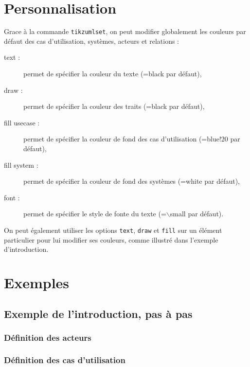 \documentclass[a4paper,11pt]{report}
\newcommand{\inputTikZ}[1]{%
  }%
\newcommand{\inputTikZ}[1]{%
    \texttt{[image: fig/\#1.pdf]}%
  }%
\begin{document}
\section{Personnalisation}\label{s.fitusecase}

Grace à la commande {\tt tikzumlset}, on peut modifier globalement les couleurs par défaut des cas d'utilisation, systèmes, acteurs et relations :

\begin{description}
\item[text :] permet de spécifier la couleur du texte (=black par défaut),
\item[draw :] permet de spécifier la couleur des traits (=black par défaut),
\item[fill usecase :] permet de spécifier la couleur de fond des cas d'utilisation (=blue!20 par défaut),
\item[fill system :] permet de spécifier la couleur de fond des systèmes (=white par défaut),
\item[font :] permet de spécifier le style de fonte du texte (=$\backslash$small par défaut).
\end{description}

On peut également utiliser les options {\tt text}, {\tt draw} et {\tt fill} sur un élément particulier pour lui modifier ses couleurs, comme illustré dans l'exemple d'introduction.

\section{Exemples}

\subsection{Exemple de l'introduction, pas à pas}

\subsubsection{Définition des acteurs}

{\color{red!70!black}

}

\begin{center}
\inputTikZ{usecasediagstep1}
\end{center}

\subsubsection{Définition des cas d'utilisation}
\end{document}
